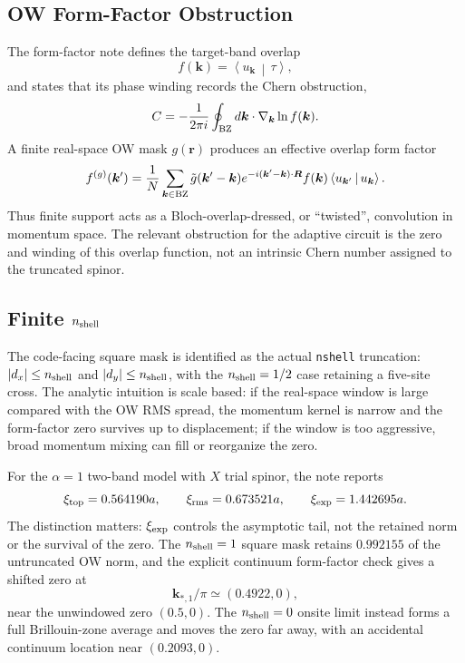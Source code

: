\documentclass[aps,prb,onecolumn,nofootinbib,superscriptaddress]{revtex4-2}
\newcommand{\braket}[2]{\left\langle #1\,\middle|\,#2\right\rangle}
\begin{document}
\subsection{OW Form-Factor Obstruction}

The form-factor note defines the target-band overlap
\begin{equation}
f(\bm{k})=\braket{u_{\bm{k}}}{\tau},
\end{equation}
and states that its phase winding records the Chern obstruction,
\begin{equation}
C=-\frac{1}{2\pi i}\oint_{\rm BZ}d\bm{k}\cdot\nabla_{\bm{k}}\ln f(\bm{k}).
\end{equation}
A finite real-space OW mask $g(\bm{r})$ produces an effective overlap form factor
\begin{equation}
f^{(g)}(\bm{k}')=
\frac{1}{N}\sum_{\bm{k}\in{\rm BZ}}
\tilde g(\bm{k}'-\bm{k})e^{-i(\bm{k}'-\bm{k})\cdot\bm{R}}
f(\bm{k})\braket{u_{\bm{k}'}}{u_{\bm{k}}}.
\end{equation}
Thus finite support acts as a Bloch-overlap-dressed, or ``twisted'', convolution in momentum space.  The relevant obstruction for the adaptive circuit is the zero and winding of this overlap function, not an intrinsic Chern number assigned to the truncated spinor.

\subsection{Finite \texorpdfstring{$n_{\rm shell}$}{nshell}}

The code-facing square mask is identified as the actual \texttt{nshell} truncation: $|d_x|\le n_{\rm shell}$ and $|d_y|\le n_{\rm shell}$, with the $n_{\rm shell}=1/2$ case retaining a five-site cross.  The analytic intuition is scale based: if the real-space window is large compared with the OW RMS spread, the momentum kernel is narrow and the form-factor zero survives up to displacement; if the window is too aggressive, broad momentum mixing can fill or reorganize the zero.

For the $\alpha=1$ two-band model with $X$ trial spinor, the note reports
\begin{equation}
\xi_{\rm top}=0.564190a,\qquad
\xi_{\rm rms}=0.673521a,\qquad
\xi_{\rm exp}=1.442695a.
\end{equation}
The distinction matters: $\xi_{\rm exp}$ controls the asymptotic tail, not the retained norm or the survival of the zero.  The $n_{\rm shell}=1$ square mask retains $0.992155$ of the untruncated OW norm, and the explicit continuum form-factor check gives a shifted zero at
\begin{equation}
\bm{k}_{*,1}/\pi\simeq(0.4922,0),
\end{equation}
near the unwindowed zero $(0.5,0)$.  The $n_{\rm shell}=0$ onsite limit instead forms a full Brillouin-zone average and moves the zero far away, with an accidental continuum location near $(0.2093,0)$.
\end{document}
